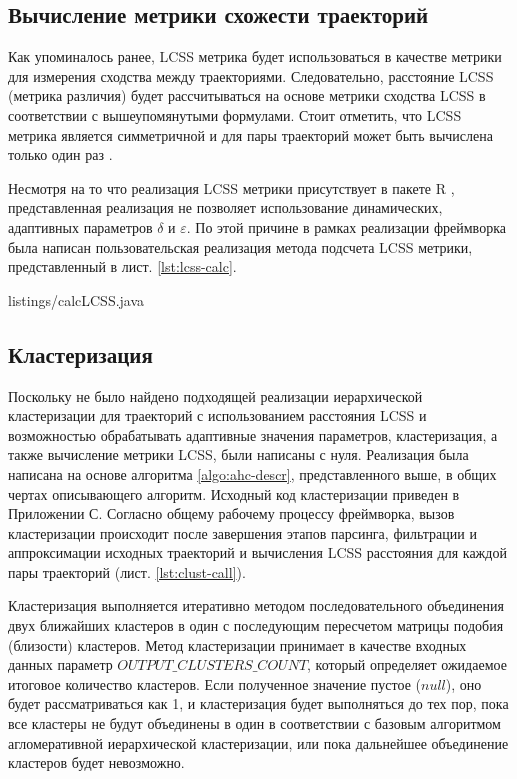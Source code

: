 \subsection{Вычисление метрики схожести траекторий}

Как упоминалось ранее, LCSS метрика будет использоваться в качестве метрики для измерения сходства между траекториями. Следовательно, расстояние LCSS (метрика различия) будет рассчитываться на основе метрики сходства LCSS в соответствии с вышеупомянутыми формулами. Стоит отметить, что LCSS метрика является симметричной и для пары траекторий может быть вычислена только один раз \cite{inproceedings:28_lcss_dsmt}.

Несмотря на то что реализация LCSS метрики присутствует в пакете R \cite{online:r_lcss}, представленная реализация не позволяет использование динамических, адаптивных параметров $\delta$ и $\varepsilon$. По этой причине в рамках реализации фреймворка была написан пользовательская реализация метода подсчета LCSS метрики, представленный в лист. \ref{lst:lcss-calc}.

 {listings/calcLCSS.java}

\subsection{Кластеризация}

Поскольку не было найдено подходящей реализации иерархической кластеризации для траекторий с использованием расстояния LCSS и возможностью обрабатывать адаптивные значения параметров, кластеризация, а также вычисление метрики LCSS, были написаны с нуля. Реализация была написана на основе алгоритма \ref{algo:ahc-descr}, представленного выше, в общих чертах описывающего алгоритм. Исходный код кластеризации приведен в Приложении С. Согласно общему рабочему процессу фреймворка, вызов кластеризации происходит после завершения этапов парсинга, фильтрации и аппроксимации исходных траекторий и вычисления LCSS расстояния для каждой пары траекторий (лист. \ref{lst:clust-call}).



Кластеризация выполняется итеративно методом последовательного объединения двух ближайших кластеров в один с последующим пересчетом матрицы подобия (близости) кластеров. Метод кластеризации принимает в качестве входных данных параметр $OUTPUT\_CLUSTERS\_COUNT$, который определяет ожидаемое итоговое количество кластеров. Если полученное значение пустое ($null$), оно будет рассматриваться как 1, и кластеризация будет выполняться до тех пор, пока все кластеры не будут объединены в один в соответствии с базовым алгоритмом агломеративной иерархической кластеризации, или пока дальнейшее объединение кластеров будет невозможно.

